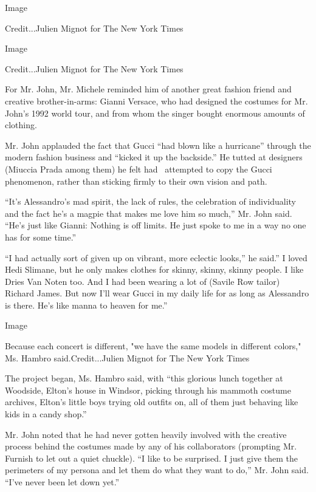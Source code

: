 Image

Credit...Julien Mignot for The New York Times

Image

Credit...Julien Mignot for The New York Times

For Mr. John, Mr. Michele reminded him of another great fashion friend
and creative brother-in-arms: Gianni Versace, who had designed the
costumes for Mr. John's 1992 world tour, and from whom the singer bought
enormous amounts of clothing.

Mr. John applauded the fact that Gucci ``had blown like a hurricane''
through the modern fashion business and ``kicked it up the backside.''
He tutted at designers (Miuccia Prada among them) he felt had~ attempted
to copy the Gucci phenomenon, rather than sticking firmly to their own
vision and path.

``It's Alessandro's mad spirit, the lack of rules, the celebration of
individuality and the fact he's a magpie that makes me love him so
much,'' Mr. John said. ``He's just like Gianni: Nothing is off limits.
He just spoke to me in a way no one has for some time.''

``I had actually sort of given up on vibrant, more eclectic looks,'' he
said.'' I loved Hedi Slimane, but he only makes clothes for skinny,
skinny, skinny people. I like Dries Van Noten too. And I had been
wearing a lot of (Savile Row tailor) Richard James. But now I'll wear
Gucci in my daily life for as long as Alessandro is there. He's like
manna to heaven for me.''

Image

Because each concert is different, "we have the same models in different
colors," Ms. Hambro said.Credit...Julien Mignot for The New York Times

The project began, Ms. Hambro said, with ``this glorious lunch together
at Woodside, Elton's house in Windsor, picking through his mammoth
costume archives, Elton's little boys trying old outfits on, all of them
just behaving like kids in a candy shop.''

Mr. John noted that he had never gotten heavily involved with the
creative process behind the costumes made by any of his collaborators
(prompting Mr. Furnish to let out a quiet chuckle). ``I like to be
surprised. I just give them the perimeters of my persona and let them do
what they want to do,'' Mr. John said. ``I've never been let down yet.''

